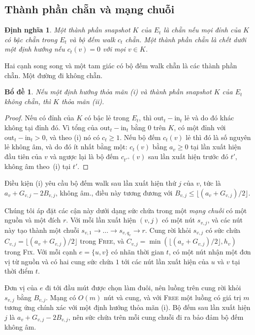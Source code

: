 \documentclass[pdflatex,sn-mathphys-num]{sn-jnl}
\theoremstyle{thmstyleone}
\newtheorem{lemma}[theorem]{Bổ đề}
\theoremstyle{thmstyletwo}
\theoremstyle{thmstylethree}
\newtheorem{definition}{Định nghĩa}
\newcommand{\out}{\mathrm{out}}
\newcommand{\inn}{\mathrm{in}}
\newcommand{\FIX}{\textup{\textsc{Fix}}}
\newcommand{\FREE}{\textup{\textsc{Free}}}
\newcommand{\floor}[1]{\lfloor #1\rfloor}
\begin{document}
\subsection{Thành phần chẵn và mạng chuỗi}

\begin{definition}\label{def:even}
Một thành phần snapshot $K$ của $E_t$ là \emph{chẵn} nếu mọi đỉnh của $K$ có bậc chẵn trong $E_t$ và bộ đếm walk $c_t$ chẵn. Một thành phần chẵn là \emph{chết} dưới một định hướng nếu $c_t(v)=0$ với mọi $v\in K$.
\end{definition}

Hai cạnh song song và một tam giác có bộ đếm walk chẵn là các thành phần chẵn. Một đường đi không chẵn.

\begin{lemma}\label{lem:noneven}
Nếu một định hướng thỏa mãn (i) và thành phần snapshot $K$ của $E_t$ không chẵn, thì $K$ thỏa mãn (ii).
\end{lemma}

\begin{proof}
Nếu có đỉnh của $K$ có bậc lẻ trong $E_t$, thì $\out_t-\inn_t$ lẻ và do đó khác không tại đỉnh đó. Vì tổng của $\out_t-\inn_t$ bằng $0$ trên $K$, có một đỉnh với $\out_t-\inn_t>0$, và theo (i) nó có $c_t\ge1$. Nếu bộ đếm $c_t(v)$ lẻ thì đó là số nguyên lẻ không âm, và do đó ít nhất bằng một: $c_t(v)$ bằng $a_v\ge0$ tại lần xuất hiện đầu tiên của $v$ và ngược lại là bộ đếm $c_{t'^+}(v)$ sau lần xuất hiện trước đó $t'$, không âm theo~(i) tại $t'$.
\end{proof}

Điều kiện (i) yêu cầu bộ đếm walk sau lần xuất hiện thứ $j$ của $v$, tức là $a_v+G_{v,j}-2B_{v,j}$, không âm., điều này tương đương với $B_{v,j}\le\floor{(a_v+G_{v,j})/2}$.

Chúng tôi áp đặt các cận này dưới dạng sức chứa trong một \emph{mạng chuỗi} có một nguồn và một đích $r$. Với mỗi lần xuất hiện $(v,j)$ có một nút $s_{v,j}$, và các nút này tạo thành một chuỗi $s_{v,1}\to\dots\to s_{v,q_v}\to r$. Cung rời khỏi $s_{v,j}$ có sức chứa $C_{v,j}=\floor{(a_v+G_{v,j})/2}$ trong \FREE{}, và $C_{v,j}=\min(\floor{(a_v+G_{v,j})/2},h_v)$ trong \FIX{}. Với mỗi cạnh $e=\{u,v\}$ có nhãn thời gian $t$, có một nút nhận một đơn vị từ nguồn và có hai cung sức chứa $1$ tới các nút lần xuất hiện của $u$ và $v$ tại thời điểm $t$.

Đơn vị của $e$ đi tới đầu mút được chọn làm đuôi, nên luồng trên cung rời khỏi $s_{v,j}$ bằng $B_{v,j}$. Mạng có $O(m)$ nút và cung, và với \FREE{} một luồng có giá trị $m$ tương ứng chính xác với một định hướng thỏa mãn (i). Bộ đếm sau lần xuất hiện $j$ là $a_v+G_{v,j}-2B_{v,j}$, nên sức chứa trên mỗi cung chuỗi đi ra bảo đảm bộ đếm không âm.
\end{document}

